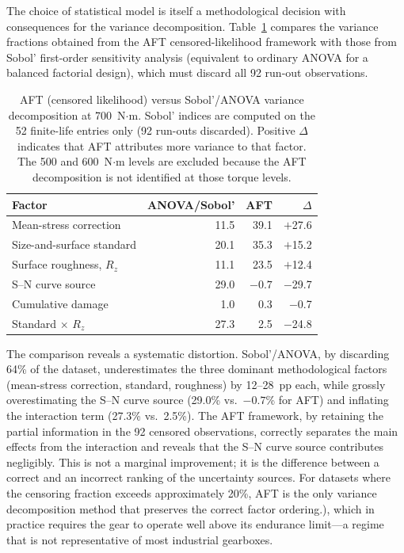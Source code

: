 \documentclass[12pt,a4paper]{article}
\begin{document}
The choice of statistical model is itself a methodological decision
with consequences for the variance decomposition. Table~\ref{tab:aft_vs_anova}
compares the variance fractions obtained from the AFT censored-likelihood
framework with those from Sobol' first-order sensitivity analysis
(equivalent to ordinary ANOVA for a balanced factorial design), which
must discard all 92 run-out observations.

\begin{table}[h]
\centering
\caption{AFT (censored likelihood) versus Sobol'/ANOVA variance
decomposition at 700~N$\cdot$m. Sobol' indices are computed on the
52 finite-life entries only (92 run-outs discarded). Positive
$\Delta$ indicates that AFT attributes more variance to that factor.
The 500 and 600~N$\cdot$m levels are excluded because the AFT
decomposition is not identified at those torque levels.\label{tab:aft_vs_anova}}
\begin{tabular}{lrrr}
\toprule
Factor & ANOVA/Sobol' & AFT & $\Delta$ \\
\midrule
Mean-stress correction & 11.5 & 39.1 & $+$27.6 \\
Size-and-surface standard & 20.1 & 35.3 & $+$15.2 \\
Surface roughness, $R_z$ & 11.1 & 23.5 & $+$12.4 \\
S--N curve source & 29.0 & $-0.7$ & $-$29.7 \\
Cumulative damage & 1.0 & 0.3 & $-$0.7 \\
Standard $\times$ $R_z$ & 27.3 & 2.5 & $-$24.8 \\
\bottomrule
\end{tabular}
\end{table}

The comparison reveals a systematic distortion. Sobol'/ANOVA, by
discarding 64\% of the dataset, underestimates the three dominant
methodological factors (mean-stress correction, standard, roughness)
by 12--28~pp each, while grossly overestimating the S--N curve source
(29.0\% vs.\ $-0.7$\% for AFT) and inflating the interaction term
(27.3\% vs.\ 2.5\%). The AFT framework, by retaining the partial
information in the 92 censored observations, correctly separates the
main effects from the interaction and reveals that the S--N curve
source contributes negligibly. This is not a marginal improvement;
it is the difference between a correct and an incorrect ranking of the
uncertainty sources. For datasets where the censoring fraction exceeds
approximately 20\%, AFT is the only variance decomposition method that
preserves the correct factor ordering.), which in practice
requires the gear to operate well above its endurance limit---a regime
that is not representative of most industrial gearboxes.
\end{document}
